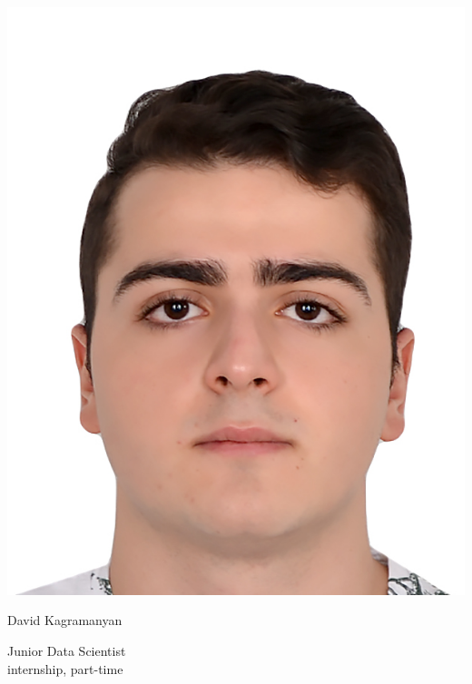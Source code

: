 \documentclass[9pt]{developercv} %
\begin{document}
	
	
	\begin{minipage}[t]{0.45\textwidth} %
		\vspace{-\baselineskip} %
		

			\includegraphics[scale=0.65]{photo.jpg}

		\huge{David Kagramanyan} %
		
		\vspace{6pt}
		
		{\huge Junior Data Scientist\\}
		\normalsize{internship, part-time}
		
		
	
	\end{minipage}
\end{document}
